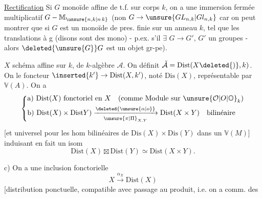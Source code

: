 \uline{Rectification} \quad Si $G$ monoïde affine de t.f. sur corps $k$, on a une immersion fermée multiplicatif $G\mathbin{-}\mathbb M_{\unsure{n,k|n\,k}}$ (non $G\to\unsure{GL_{n,k}|Gl_{n,k}}$\unsure{)} car on peut montrer que si $G$ est un monoïde de pres. finie sur un anneau $k$, tel que les translations à g (disons sont des mono) - p.ex. s'il $\exists$  $G\longrightarrow G'$, $G'$ un  groupes - alors $\deleted{\unsure{G}}G$ est un objet gr-pe).


 $X$ schéma affine sur $k$,  de $k$-algèbre $\mathcal A$. On définit $\check{\mathcal A}=\mathrm{Dist}(X\deleted{)},k)$. On  le foncteur $\inserted{k'}\rightarrow\mathrm{Dist}(X,k')$, noté $\mathrm{Dis}(X)$, représentable par $\mathbb V(A)$. On a
\reversemarginpar{}\normalmarginpar
\[
\left\{\begin{aligned}
&\text{a)}\ \mathrm{Dist}(X)\ \text{fonctoriel en }X\quad
  (\text{comme Module sur }\unsure{\mathcal O|O|\mathbb O}_k)\\
&\text{b)}\ \mathrm{Dist}(X)\times\mathrm{Dist}Y)
  \xrightarrow[\unsure{\pi|\Pi}_{X,Y}]{\deleted{\unsure{\alpha|o}}}
  \mathrm{Dist}(X\times Y)\quad\text{bilinéaire}
\end{aligned}\right.
\]
[et universel pour les hom bilinéaires de $\mathrm{Dis}(X)\times\mathrm{Dis}(Y)$ dans un $\mathbb V(M)$] induisant en fait un isom
\[
\mathrm{Dist}(X)\boxtimes\mathrm{Dist}(Y)\simeq\mathrm{Dist}(X\times Y).
\]

c) On a une inclusion fonctorielle
\[
X\xrightarrow{\alpha_X}\mathrm{Dist}(X)
\]
[distribution ponctuelle, compatible avec passage au produit, i.e. on a comm. des

